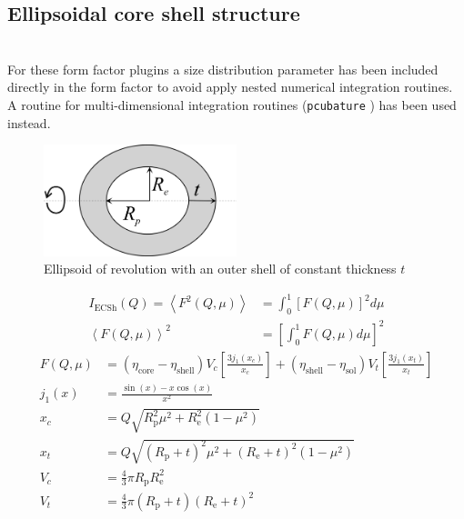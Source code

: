 \subsection{Ellipsoidal core shell structure}
\label{sect:EllipsoidalCoreShell} ~\\
For these form factor plugins a size distribution parameter has been included directly in the form factor to avoid apply nested numerical integration routines. A routine for multi-dimensional integration routines (\texttt{pcubature} \cite{Johnson}) has been used instead. 
\begin{figure}[htb]
\begin{center}
\includegraphics[width=0.5\textwidth,height=0.28855\textwidth]{../images/form_factor/Ellipsoid/ellipsoidalShell.png}
\end{center}
\caption{Ellipsoid of revolution with an outer shell of constant thickness $t$} \label{ellipsoidalShell}
\end{figure}
\begin{align}
I_\text{ECSh}(Q) = \left\langle F^2(Q,\mu) \right\rangle
& = \int_0^1 \left[F(Q,\mu)\right]^2 d\mu \\
\left\langle F(Q,\mu) \right\rangle^2 & = \left[\int_0^1 F(Q,\mu)
d\mu \right]^2
\end{align}
\begin{align}
F(Q,\mu) &= \left(\eta_\text{core}-\eta_\text{shell}\right) V_c\left[
\frac{3j_1(x_c)}{x_c}\right]
          +\left(\eta_\text{shell}-\eta_\text{sol}\right) V_t\left[ \frac{3j_1(x_t)}{x_t}\right]
          \nonumber \\
j_1(x) &= \frac{\sin(x)-x\cos(x)}{x^2} \nonumber \\
x_c &= Q \sqrt{R_\mathrm{p}^2\mu^2+R_\mathrm{e}^2(1-\mu^2)} \nonumber \\
x_t &= Q \sqrt{(R_\mathrm{p}+t)^2\mu^2+(R_\mathrm{e}+t)^2(1-\mu^2)} \nonumber \\
V_c &= \frac{4}{3}\pi R_\mathrm{p}R_\mathrm{e}^2 \nonumber \\
V_t &= \frac{4}{3}\pi (R_\mathrm{p}+t)(R_\mathrm{e}+t)^2 \nonumber
\end{align}
